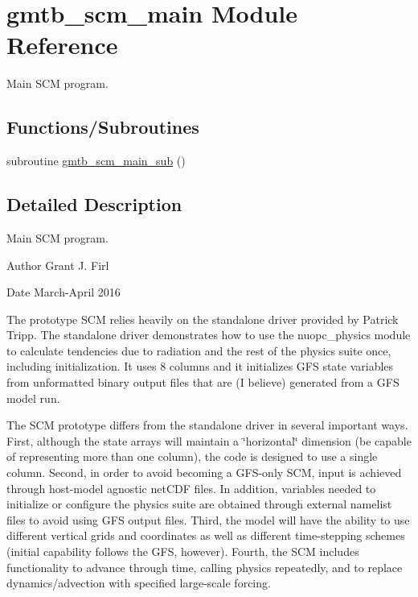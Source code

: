 \hypertarget{namespacegmtb__scm__main}{}\section{gmtb\+\_\+scm\+\_\+main Module Reference}
\label{namespacegmtb__scm__main}


Main S\+CM program.  


\subsection*{Functions/\+Subroutines}
\begin{DoxyCompactItemize}
\item 
subroutine \hyperlink{namespacegmtb__scm__main_af2e62134ed0a98729f7dbc2d5753e547}{gmtb\+\_\+scm\+\_\+main\+\_\+sub} ()
\end{DoxyCompactItemize}


\subsection{Detailed Description}
Main S\+CM program. 

\begin{DoxyAuthor}{Author}
Grant J. Firl 
\end{DoxyAuthor}
\begin{DoxyDate}{Date}
March-\/\+April 2016
\end{DoxyDate}
The prototype S\+CM relies heavily on the standalone driver provided by Patrick Tripp. The standalone driver demonstrates how to use the nuopc\+\_\+physics module to calculate tendencies due to radiation and the rest of the physics suite once, including initialization. It uses 8 columns and it initializes G\+FS state variables from unformatted binary output files that are (I believe) generated from a G\+FS model run.

The S\+CM prototype differs from the standalone driver in several important ways. First, although the state arrays will maintain a \char`\"{}horizontal\char`\"{} dimension (be capable of representing more than one column), the code is designed to use a single column. Second, in order to avoid becoming a G\+F\+S-\/only S\+CM, input is achieved through host-\/model agnostic net\+C\+DF files. In addition, variables needed to initialize or configure the physics suite are obtained through external namelist files to avoid using G\+FS output files. Third, the model will have the ability to use different vertical grids and coordinates as well as different time-\/stepping schemes (initial capability follows the G\+FS, however). Fourth, the S\+CM includes functionality to advance through time, calling physics repeatedly, and to replace dynamics/advection with specified large-\/scale forcing.

